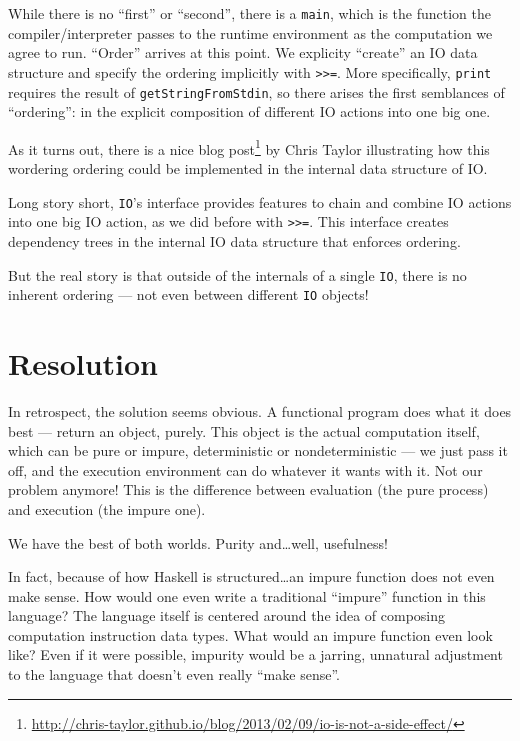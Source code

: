 \documentclass[]{article}
\renewcommand{\href}[2]{#2\footnote{\url{#1}}}
\begin{document}
While there is no ``first'' or ``second'', there is a \texttt{main},
which is the function the compiler/interpreter passes to the runtime
environment as the computation we agree to run. ``Order'' arrives at
this point. We explicity ``create'' an IO data structure and specify the
ordering implicitly with \texttt{\textgreater{}\textgreater{}=}. More
specifically, \texttt{print} requires the result of
\texttt{getStringFromStdin}, so there arises the first semblances of
``ordering'': in the explicit composition of different IO actions into
one big one.

As it turns out, there is a
\href{http://chris-taylor.github.io/blog/2013/02/09/io-is-not-a-side-effect/}{nice
blog post} by Chris Taylor illustrating how this wordering ordering
could be implemented in the internal data structure of IO.

Long story short, \texttt{IO}'s interface provides features to chain and
combine IO actions into one big IO action, as we did before with
\texttt{\textgreater{}\textgreater{}=}. This interface creates
dependency trees in the internal IO data structure that enforces
ordering.

But the real story is that outside of the internals of a single
\texttt{IO}, there is no inherent ordering --- not even between
different \texttt{IO} objects!

\section{Resolution}\label{resolution}

In retrospect, the solution seems obvious. A functional program does
what it does best --- return an object, purely. This object is the
actual computation itself, which can be pure or impure, deterministic or
nondeterministic --- we just pass it off, and the execution environment
can do whatever it wants with it. Not our problem anymore! This is the
difference between evaluation (the pure process) and execution (the
impure one).

We have the best of both worlds. Purity and\ldots{}well, usefulness!

In fact, because of how Haskell is structured\ldots{}an impure function
does not even make sense. How would one even write a traditional
``impure'' function in this language? The language itself is centered
around the idea of composing computation instruction data types. What
would an impure function even look like? Even if it were possible,
impurity would be a jarring, unnatural adjustment to the language that
doesn't even really ``make sense''.
\end{document}
